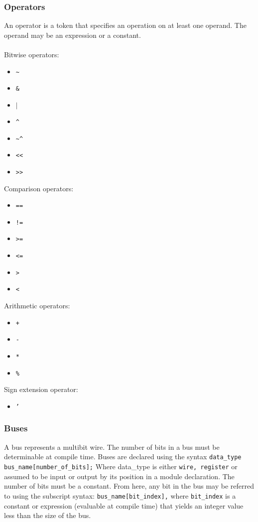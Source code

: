 \documentclass[letterpaper,11pt]{article}
\begin{document}
        \subsubsection{Operators}
        An operator is a token that specifies an operation on at least one operand. The operand 
        may be an expression or a constant. \\\\
        Bitwise operators:
        \begin{itemize}
        \item{\texttt{\~}} 
        \item{\texttt{\& }}
        \item{\texttt{$\mid$}}
        \item{\texttt{\^}}
        \item{\texttt{\textasciitilde \^}} 
        \item{\texttt{<<}} 
        \item{\texttt{>>}}
        \end{itemize}
        Comparison operators: 
        \begin{itemize}
        \item{\texttt{==}}
        \item{\texttt{!=}}
        \item{\texttt{>= }}
        \item{\texttt{<= }}
        \item{\texttt{> }}
        \item{\texttt{<}}
        \end{itemize}
        Arithmetic operators: 
        \begin{itemize}
        \item{\texttt{+}}
        \item{\texttt{- }}
        \item{\texttt{* }}
        \item{\texttt{\%}} 
        \end{itemize}
        Sign extension operator: 
        \begin{itemize}
        \item{\texttt{'}}
        \end{itemize}
        \subsubsection{Buses}
        A bus represents a multibit wire. The number of bits in a bus must be determinable at compile 
        time. Buses are declared using the syntax \texttt{data\_type bus\_name[number\_of\_bits];} Where 
        data\_type is either \texttt{wire, register} or assumed to be input or output by its position in a module 
        declaration. The number of bits must be a constant. From here, any bit in the bus may be referred 
        to using the subscript syntax: \texttt{bus\_name[bit\_index],} where \texttt{bit\_index} is a constant or expression (evaluable at compile time) that yields an integer value less than the size of the bus. 
        
\end{document}
